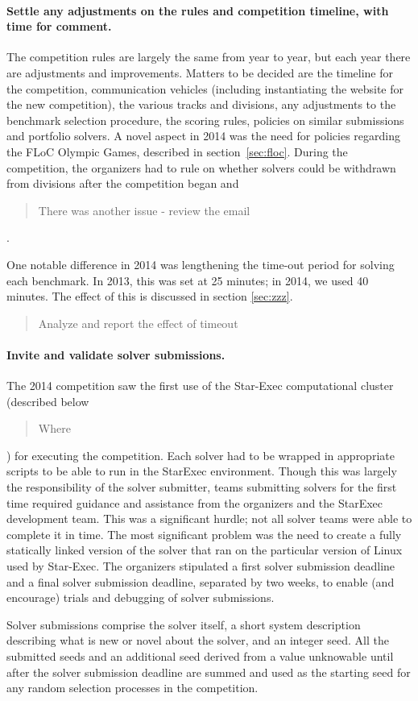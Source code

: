 \documentclass[twosize,11pt]{article}
\newcommand{\comment}[2]{\begin{quote}\sc #1\marginpar{\textcolor{red}{$\ast^{\mbox{#2}}$}}\end{quote}}
\newcommand{\davidc}[1]{\comment{#1}{DC}}
\begin{document}
\paragraph{Settle any adjustments on the rules and competition timeline, with time for comment.} 
The competition rules are largely the same from year to year, but each year there are adjustments and improvements. Matters to be decided are the timeline for the competition, communication vehicles (including instantiating the website for the new competition), the various tracks and divisions, any adjustments to the benchmark selection procedure, the scoring rules, policies on similar submissions and portfolio solvers. A novel aspect in 2014 was the need for policies regarding the FLoC Olympic Games, described in section~\ref{sec:floc}. During the competition, the organizers had to rule on whether solvers could be withdrawn from divisions after the competition began and \davidc{There was another issue - review the email}.

One notable difference in 2014 was lengthening the time-out period for solving each benchmark. In 2013, this was set at 25 minutes; in 2014, we used 40 minutes. The effect of this is discussed in section \ref{sec:zzz}.
\davidc{Analyze and report the effect of timeout}

\paragraph{Invite and validate solver submissions.} The 2014 competition saw the first use of the Star-Exec computational cluster (described below \davidc{Where}) for executing the competition. Each solver had to be wrapped in appropriate scripts to be able to run in the StarExec environment. Though this was largely the responsibility of the solver submitter, teams submitting solvers for the first time required guidance and assistance from the organizers and the StarExec development team. This was a significant hurdle; not all solver teams were able to complete it in time. The most significant problem was the need to create a fully statically linked version of the solver that ran on the particular version of Linux used by Star-Exec. The organizers stipulated a first solver submission deadline and a final solver submission deadline, separated by two weeks, to enable (and encourage) trials and debugging of solver submissions.

Solver submissions comprise the solver itself, a short system description describing what is new or novel about the solver, and an integer seed. All the submitted seeds and an additional seed derived from a value unknowable until after the solver submission deadline are summed and used as the starting seed for any random selection processes in the competition.
\end{document}
